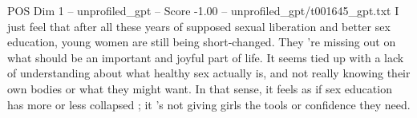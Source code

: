 \begin{textsample}{POS Dim 1 – unprofiled\_gpt – Score -1.00 – unprofiled\_gpt/t001645\_gpt.txt}  \label{ex:f1_pos_026}
I just feel that after all these years of supposed sexual liberation and better sex education, young women are still being short‑changed.
They ’re missing out on what should be an important and joyful part of life.
It seems tied up with a lack of understanding about what healthy sex actually is, and not really knowing their own bodies or what they might want.
In that sense, it feels as if sex education has more or less collapsed ; it ’s not giving girls the tools or confidence they need.

\end{textsample}
